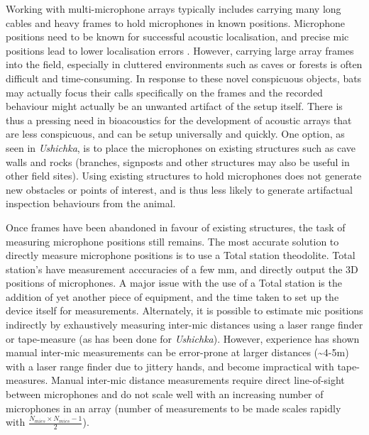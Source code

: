 \documentclass[
]{book}
\begin{document}
Working with multi-microphone arrays typically includes carrying many long cables and heavy frames to hold microphones in known positions. Microphone positions need to be known for successful acoustic localisation, and precise mic positions lead to lower localisation errors \citep{Wahlberg1999}. However, carrying large array frames into the field, especially in cluttered environments such as caves or forests is often difficult and time-consuming. In response to these novel conspicuous objects, bats may actually focus their calls specifically on the frames and the recorded behaviour might actually be an unwanted artifact of the setup itself. There is thus a pressing need in bioacoustics for the development of acoustic arrays that are less conspicuous, and can be setup universally and quickly. One option, as seen in \emph{Ushichka}, is to place the microphones on existing structures such as cave walls and rocks (branches, signposts and other structures may also be useful in other field sites). Using existing structures to hold microphones does not generate new obstacles or points of interest, and is thus less likely to generate artifactual inspection behaviours from the animal.

Once frames have been abandoned in favour of existing structures, the task of measuring microphone positions still remains. The most accurate solution to directly measure microphone positions is to use a Total station theodolite. Total station's have measurement acccuracies of a few mm, and directly output the 3D positions of microphones. A major issue with the use of a Total station is the addition of yet another piece of equipment, and the time taken to set up the device itself for measurements. Alternately, it is possible to estimate mic positions indirectly by exhaustively measuring inter-mic distances using a laser range finder or tape-measure (as has been done for \emph{Ushichka}). However, experience has shown manual inter-mic measurements can be error-prone at larger distances (\textasciitilde4-5m) with a laser range finder due to jittery hands, and become impractical with tape-measures. Manual inter-mic distance measurements require direct line-of-sight between microphones and do not scale well with an increasing number of microphones in an array (number of measurements to be made scales rapidly with \(\frac{N_{mics}\times N_{mics}-1}{2}\)).
\end{document}

